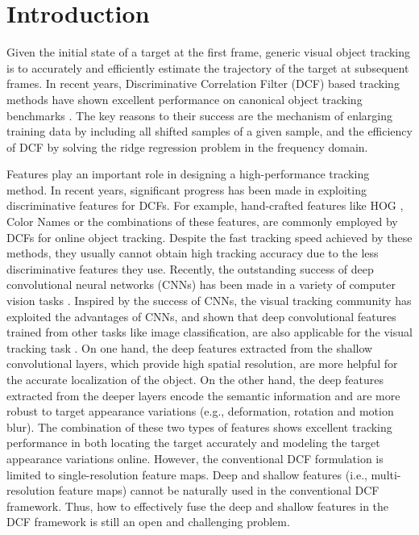 \documentclass[runningheads]{llncs}
\begin{document}
\section{Introduction}
Given the initial state of a target at the first frame, generic visual object tracking is to accurately and efficiently estimate the trajectory of the target at subsequent frames. In recent years, Discriminative Correlation Filter (DCF) based tracking methods have shown excellent performance on canonical object tracking benchmarks \cite{OTB50,OTB100}. The key reasons to their success are the mechanism of enlarging training data by including all shifted samples of a given sample, and the efficiency of DCF by solving the ridge regression problem in the frequency domain. 

Features play an important role in designing a high-performance tracking method. In recent years, significant progress has been made in exploiting discriminative features for DCFs. For example, hand-crafted features like HOG \cite{HOG}, Color Names \cite{CN} or the combinations of these features, are commonly employed by DCFs for online object tracking. Despite the fast tracking speed achieved by these methods, they usually cannot obtain high tracking accuracy due to the less discriminative features they use. Recently, the outstanding success of deep convolutional neural networks (CNNs) has been made in a variety of computer vision tasks \cite{KCF,SSD,Deconv}. Inspired by the success of CNNs, the visual tracking community has exploited the advantages of CNNs, and shown that deep convolutional features trained from other tasks like image classification, are also applicable for the visual tracking task \cite{HDT}. On one hand, the deep features extracted from the shallow convolutional layers, which provide high spatial resolution, are more helpful for the accurate localization of the object. On the other hand, the deep features extracted from the deeper layers encode the semantic information and are more robust to target appearance variations (e.g., deformation, rotation and motion blur). The combination of these two types of features shows excellent tracking performance in both locating the target accurately and modeling the target appearance variations online. However, the conventional DCF formulation is limited to single-resolution feature maps. Deep and shallow features (i.e., multi-resolution feature maps) cannot be naturally used in the conventional DCF framework. Thus, how to effectively fuse the deep and shallow features in the DCF framework is still an open and challenging problem.  
\end{document}
